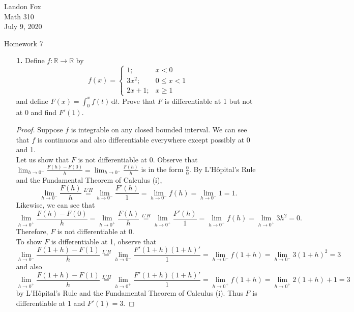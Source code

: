 \documentclass[ 12pt ]{article}
\begin{document}
\noindent Landon Fox \\
\noindent Math 310 \\
\noindent July 9, 2020

\begin{center}
\Large Homework 7
\end{center}

\begin{enumerate}
	\item[\textbf{1.}] Define $f: \mathbb{R} \rightarrow \mathbb{R}$ by \[ f(x) = \begin{cases} 1; & x < 0 \\ 3x^2; & 0 \leq x < 1 \\ 2x+1; & x \geq 1 \end{cases} \]
		and define $F(x) = \int_0^x f(t)\,\mathrm{d}t$. Prove that $F$ is differentiable at 1 but not at 0 and find $F'(1)$.

	\begin{proof}
		Suppose $f$ is integrable on any closed bounded interval. We can see that $f$ is continuous and also differentiable everywhere except possibly at 0 and 1. \\

		Let us show that $F$ is not differentiable at 0. Observe that $\lim_{h \rightarrow 0^-} \frac{F(h) - F(0)}{h} = \lim_{h \rightarrow 0^-} \frac{F(h)}{h}$ is in the
		form $\frac{0}{0}$. By L'H\^opital's Rule and the Fundamental Theorem of Calculus (i), $$\lim_{h \rightarrow 0^-} \frac{F(h)}{h} \overset{L'H}{=}
		\lim_{h \rightarrow 0^-} \frac{F'(h)}{1} = \lim_{h \rightarrow 0^-} f(h) = \lim_{h \rightarrow 0^-} 1 = 1.$$ Likewise, we can see that $$\lim_{h \rightarrow 0^+}
		\frac{F(h) - F(0)}{h} = \lim_{h \rightarrow 0^+} \frac{F(h)}{h} \overset{L'H}{=} \lim_{h \rightarrow 0^+} \frac{F'(h)}{1} = \lim_{h \rightarrow 0^+} f(h) =
		\lim_{h \rightarrow 0^+} 3h^2 = 0.$$ Therefore, $F$ is not differentiable at 0. \\

		To show $F$ is differentiable at 1, observe that $$\lim_{h \rightarrow 0^-} \frac{F(1 + h) - F(1)}{h} \overset{L'H}{=} \lim_{h \rightarrow 0^-} \frac{F'(1 + h)(1 + h)'}{1}=
		\lim_{h \rightarrow 0^-} f(1 + h) = \lim_{h \rightarrow 0^-} 3(1 + h)^2 = 3$$ and also $$\lim_{h \rightarrow 0^+} \frac{F(1 + h) - F(1)}{h} \overset{L'H}{=}
		\lim_{h \rightarrow 0^+} \frac{F'(1 + h)(1 + h)'}{1} = \lim_{h \rightarrow 0^+} f(1 + h) = \lim_{h \rightarrow 0^+} 2(1 + h) + 1 = 3$$ by L'H\^opital's Rule and the
		Fundamental Theorem of Calculus (i). Thus $F$ is differentiable at 1 and $F'(1) = 3$.
	\end{proof}
	\newpage



\end{enumerate}
\end{document}
